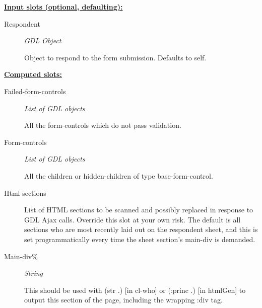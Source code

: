\documentclass [11pt]{book}
\begin{document}
\begin{itemize}
\begin{description}
\end{description}






\textbf{
\underline{Input slots (optional, defaulting):}}

\begin{description}

\item [Respondent]
\emph{GDL Object}

 Object to respond to the form submission. Defaults to self.




\end{description}






\textbf{
\underline{Computed slots:}}

\begin{description}

\item [Failed-form-controls]
\emph{List of GDL objects}

 All the form-controls which do not pass validation.




\item [Form-controls]
\emph{List of GDL objects}

 All the children or hidden-children
of type base-form-control.




\item [Html-sections]

List of HTML sections to be scanned and possibly replaced in response to
GDL Ajax calls. Override this slot at your own risk. The default is all
sections who are most recently laid out on the respondent sheet, and
this is set programmatically every time the sheet section's main-div
is demanded.




\item [Main-div\%]
\emph{String}

 This should be used with (str .) [in cl-who] or (:princ .)
[in htmlGen] to output this section of the page, including the wrapping :div tag.





\end{description}
\end{itemize}
\end{document}
